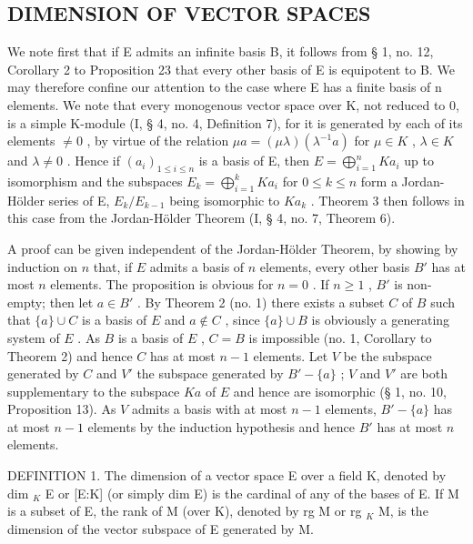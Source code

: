 \subsection{DIMENSION OF VECTOR SPACES}


We note first that if E admits an infinite basis B, it follows from § 1, no. 12, Corollary 2 to Proposition 23 that every other basis of E is equipotent to B. We may therefore confine our attention to the case where E has a finite basis of n elements. We note that every monogenous vector space over K, not reduced to 0, is a simple K-module (I, § 4, no. 4, Definition 7), for it is generated by each of its elements \(\neq0\) , by virtue of the relation \(\mu a = (\mu \lambda)(\lambda^{-1}a)\) for \(\mu \in K\) , \(\lambda \in K\) and \(\lambda \neq 0\) . Hence if \((a_{i})_{1 \leqslant i \leqslant n}\) is a basis of E, then \(E = \bigoplus_{i=1}^{n} Ka_{i}\) up to isomorphism and the subspaces \(E_{k} = \bigoplus_{i=1}^{k} Ka_{i}\) for \(0 \leqslant k \leqslant n\) form a Jordan-Hölder series of E, \(E_{k}/E_{k-1}\) being isomorphic to \(Ka_{k}\) . Theorem 3 then follows in this case from the Jordan-Hölder Theorem (I, § 4, no. 7, Theorem 6).

A proof can be given independent of the Jordan-Hölder Theorem, by showing by induction on \(n\) that, if \(E\) admits a basis of \(n\) elements, every other basis \(B'\) has at most \(n\) elements. The proposition is obvious for \(n = 0\) . If \(n \geqslant 1\) , \(B'\) is non-empty; then let \(a \in B'\) . By Theorem 2 (no. 1) there exists a subset \(C\) of \(B\) such that \(\{a\} \cup C\) is a basis of \(E\) and \(a \notin C\) , since \(\{a\} \cup B\) is obviously a generating system of \(E\) . As \(B\) is a basis of \(E\) , \(C = B\) is impossible (no. 1, Corollary to Theorem 2) and hence \(C\) has at most \(n - 1\) elements. Let \(V\) be the subspace generated by \(C\) and \(V'\) the subspace generated by \(B' - \{a\}\) ; \(V\) and \(V'\) are both supplementary to the subspace \(Ka\) of \(E\) and hence are isomorphic (§ 1, no. 10, Proposition 13). As \(V\) admits a basis with at most \(n - 1\) elements, \(B' - \{a\}\) has at most \(n - 1\) elements by the induction hypothesis and hence \(B'\) has at most \(n\) elements.

DEFINITION 1. The dimension of a vector space E over a field K, denoted by dim \(_{K}\) E or {[}E:K{]} (or simply dim E) is the cardinal of any of the bases of E. If M is a subset of E, the rank of M (over K), denoted by rg M or rg \(_{K}\) M, is the dimension of the vector subspace of E generated by M.

